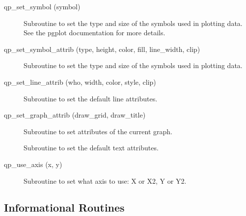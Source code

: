 \begin{description}
\label{r:qp.set.symbol}
\item[qp_set_symbol (symbol)] \Newline 
     Subroutine to set the type and size of the symbols used in plotting data.
     See the pgplot documentation for more details.

\label{r:qp.set.symbol.attrib}
\item[qp_set_symbol_attrib (type, height, color, fill, line_width, clip)] \Newline 
     Subroutine to set the type and size of the symbols used in plotting data.

\label{r:qp.set.line.attrib}
\item[qp_set_line_attrib (who, width, color, style, clip)] \Newline 
     Subroutine to set the default line attributes.

\label{r:qp.set.graph.attrib}
\item[qp_set_graph_attrib (draw_grid, draw_title)] \Newline 
     Subroutine to set attributes of the current graph.

\label{r:qp.set.text.attrib}
\item[\protect\parbox{6in}{qp_set_text_attrib (who, height, color, \\
  \hspace*{2in} background, uniform_spacing, spacing_factor)} ] \Newline 
     Subroutine to set the default text attributes.

\label{r:qp.use.axis}
\item[qp_use_axis (x, y)] \Newline 
Subroutine to set what axis to use: X or X2, Y or Y2.

\end{description}

\subsection{Informational Routines}

